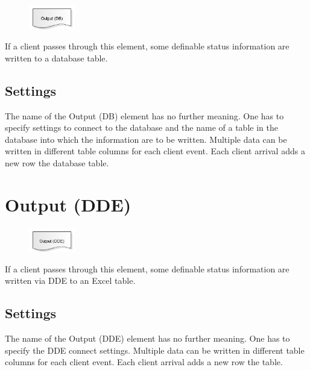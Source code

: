 \begin{figure}
\vspace{-22pt}
\includegraphics[width=2cm]{imageModelElementOutputDB.png}
\vspace{-22pt}
\end{figure}

If a client passes through this element, some definable status information are written to a database table.

\subsection*{Settings}

The name of the Output (DB) element has no further meaning. One has to specify settings to connect to
the database and the name of a table in the database into which the information are to be written.  
Multiple data can be written in different table columns for each client event. Each client arrival
adds a new row the database table.


\section{Output (DDE)}
\label{ref:ModelElementOutputDDE}

\begin{figure}
\vspace{-22pt}
\includegraphics[width=2cm]{imageModelElementOutputDDE.png}
\vspace{-22pt}
\end{figure}

If a client passes through this element, some definable status information are written via DDE to an Excel table.

\subsection*{Settings}

The name of the Output (DDE) element has no further meaning. One has to specify the DDE connect settings.  
Multiple data can be written in different table columns for each client event. Each client arrival
adds a new row the table.


